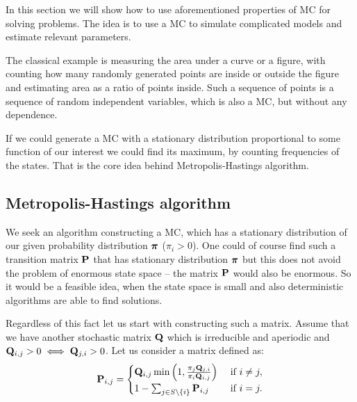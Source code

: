 In this section we will show how to use aforementioned properties of MC for solving problems. The idea is to use a MC to simulate complicated models and estimate relevant parameters.

The classical example is measuring the area under a curve or a figure, with counting how many randomly generated points are inside or outside the figure and estimating area as a ratio of points inside. Such a sequence of points is a sequence of random independent variables, which is also a MC, but without any dependence.

If we could generate a MC with a stationary distribution proportional to some function of our interest we could find its maximum, by counting frequencies of the states. That is the core idea behind Metropolis-Hastings algorithm.

\subsection{Metropolis-Hastings algorithm}
	We seek an algorithm constructing a MC, which has a stationary distribution of our given probability distribution $\boldsymbol{\pi}$ ($\pi_i > 0$). One could of course find such a transition matrix $\mathbf{P}$ that has stationary distribution $\boldsymbol{\pi}$ but this does not avoid the problem of enormous state space -- the matrix $\mathbf{P}$ would also be enormous. So it would be a feasible idea, when the state space is small and also deterministic algorithms are able to find solutions. 
	
	Regardless of this fact let us start with constructing such a matrix. Assume that we have another stochastic matrix $\mathbf{Q}$ which is irreducible and aperiodic and $\mathbf{Q}_{i,j} >0 \iff \mathbf{Q}_{j,i} > 0$. Let us consider a matrix defined as:
	\begin{equation} \label{eq:PQ}
		\mathbf{P}_{i,j} = 
		\begin{cases}
		\mathbf{Q}_{i,j} \min \left(1, \frac{\pi_j \mathbf{Q}_{j,i}}{\pi_i \mathbf{Q}_{i,j}}\right) & \text{ if } i \neq j, \\ 
		1 - \sum_{j \in S \setminus \left\{ i \right\} } \mathbf{P}_{i,j}& \text{ if } i = j.
		\end{cases}
	\end{equation} 
	

